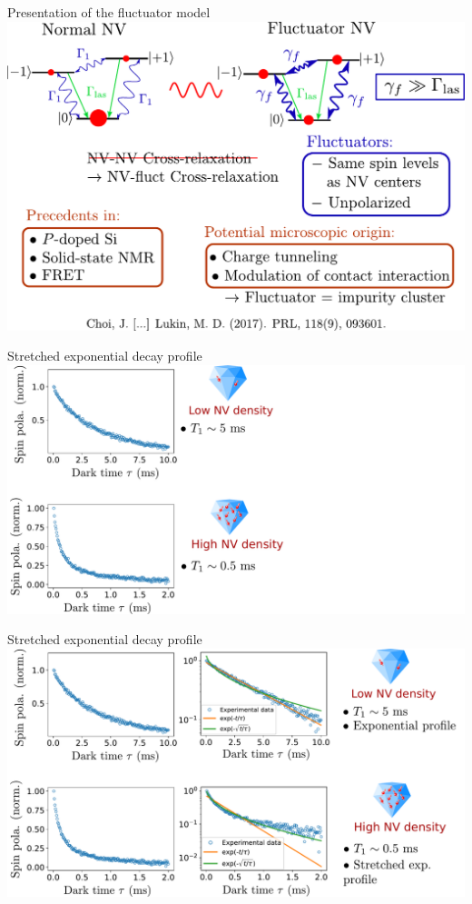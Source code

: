 \documentclass{beamer}
\begin{document}
\begin{frame}{Presentation of the fluctuator model}
\centering
\includegraphics[width=\textwidth,height=0.8\textheight,keepaspectratio]{Slide_fluct_intro_f}
\end{frame}

\begin{frame}{Stretched exponential decay profile}
\centering
\includegraphics[width=\textwidth,height=0.85\textheight,keepaspectratio]{Slide_T1_exp_stretch_f-1}
\end{frame}

\begin{frame}{Stretched exponential decay profile}
\centering
\includegraphics[width=\textwidth,height=0.85\textheight,keepaspectratio]{Slide_T1_exp_stretch_f}
\end{frame}
\end{document}
